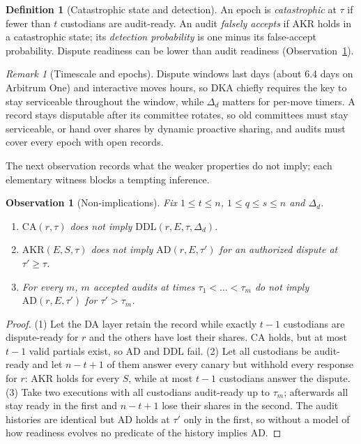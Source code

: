 \documentclass[Crown,sagev]{sagej}
\theoremstyle{plain}
\newtheorem{observation}{Observation}
\theoremstyle{definition}
\newtheorem{definition}{Definition}
\theoremstyle{remark}
\newtheorem{remark}{Remark}
\newcommand{\CA}{\mathrm{CA}}
\newcommand{\AKR}{\mathrm{AKR}}
\newcommand{\AD}{\mathrm{AD}}
\newcommand{\DDL}{\mathrm{DDL}}
\begin{document}
\begin{definition}[Catastrophic state and detection]\label{def:fa}
An epoch is \emph{catastrophic} at $\tau$ if fewer than $t$ custodians are audit-ready. An audit \emph{falsely accepts} if $\AKR$ holds in a catastrophic state; its \emph{detection probability} is one minus its false-accept probability. Dispute readiness can be lower than audit readiness (Observation~\ref{prop:nonimpl}).
\end{definition}

\begin{remark}[Timescale and epochs]
Dispute windows last days (about 6.4 days on Arbitrum One\cite{arbitrum2026chainparams}) and interactive moves hours, so DKA chiefly requires the key to stay serviceable throughout the window, while $\Delta_d$ matters for per-move timers. A record stays disputable after its committee rotates, so old committees must stay serviceable, or hand over shares by dynamic proactive sharing\cite{maram2019churp,yurek2023dpss}, and audits must cover every epoch with open records.
\end{remark}

The next observation records what the weaker properties do not imply; each elementary witness blocks a tempting inference.

\begin{observation}[Non-implications]\label{prop:nonimpl}
Fix $1\le t\le n$, $1\le q\le s\le n$ and $\Delta_d$.
\begin{enumerate}
  \item $\CA(r,\tau)$ does not imply $\DDL(r,E,\tau,\Delta_d)$.
  \item $\AKR(E,S,\tau)$ does not imply $\AD(r,E,\tau')$ for an authorized dispute at $\tau'\ge\tau$.
  \item For every $m$, $m$ accepted audits at times $\tau_1<\dots<\tau_m$ do not imply $\AD(r,E,\tau')$ for $\tau'>\tau_m$.
\end{enumerate}
\end{observation}

\begin{proof}
(1) Let the DA layer retain the record while exactly $t-1$ custodians are dispute-ready for $r$ and the others have lost their shares. $\CA$ holds, but at most $t-1$ valid partials exist, so $\AD$ and $\DDL$ fail.
(2) Let all custodians be audit-ready and let $n-t+1$ of them answer every canary but withhold every response for $r$: $\AKR$ holds for every $S$, while at most $t-1$ custodians answer the dispute.
(3) Take two executions with all custodians audit-ready up to $\tau_m$; afterwards all stay ready in the first and $n-t+1$ lose their shares in the second. The audit histories are identical but $\AD$ holds at $\tau'$ only in the first, so without a model of how readiness evolves no predicate of the history implies $\AD$.
\end{proof}
\end{document}
